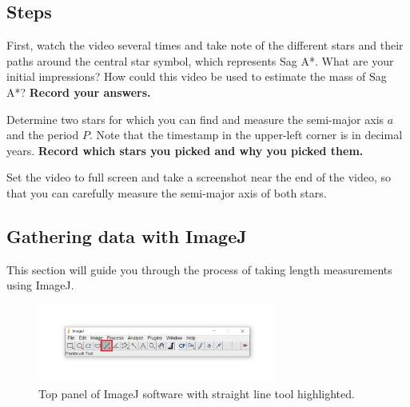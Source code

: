\subsection{Steps}
\begin{steps}
	\item First, watch the video several times and take note of the different stars and their paths around the central star symbol, which represents Sag A*. What are your initial impressions? How could this video be used to estimate the mass of Sag A*? \textbf{Record your answers.}

	\item Determine two stars for which you can find and measure the semi-major axis $a$ and the period $P$. Note that the timestamp in the upper-left corner is in decimal years. \textbf{Record which stars you picked and why you picked them.}
	
	\item Set the video to full screen and take a screenshot near the end of the video, so that you can carefully measure the semi-major axis of both stars.

\end{steps}
	
\subsection{Gathering data with ImageJ}

This section will guide you through the process of taking length measurements using ImageJ.
\begin{figure}[h]
	\centering
	\includegraphics[width=0.7\textwidth]{galactic-center/line_tool.png}
	\caption {Top panel of ImageJ software with straight line tool highlighted.}
	\label{gc:fig:linetool}
\end{figure}

